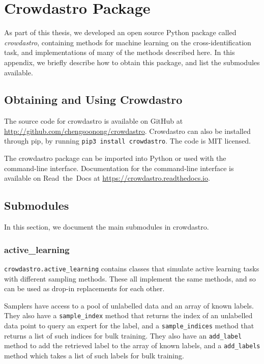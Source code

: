 
\appendix
\chapter{Crowdastro Package}
\label{cha:crowdastro}

As part of this thesis, we developed an open source Python package called
\emph{crowdastro}, containing methods for machine learning on the
cross-identification task, and implementations of many of the methods described
here. In this appendix, we briefly describe how to obtain this package, and list
the submodules available.

\section{Obtaining and Using Crowdastro}

    The source code for crowdastro is available on GitHub at
    \url{http://github.com/chengsoonong/crowdastro}. Crowdastro can also be
    installed through pip, by running \texttt{pip3 install crowdastro}. The code
    is MIT licensed.

    The crowdastro package can be imported into Python or used with the
    command-line interface. Documentation for the command-line interface is
    available on Read~the~Docs at \url{https://crowdastro.readthedocs.io}.

\section{Submodules}
    \label{sec:crowdastro-submodules}

    In this section, we document the main submodules in crowdastro.

    \subsection{active\_learning}
    \label{sec:crowdastro-active-learning}

        \texttt{crowdastro.active\_learning} contains classes that simulate
        active learning tasks with different sampling methods. These all
        implement the same methods, and so can be used as drop-in replacements
        for each other.

        Samplers have access to a pool of unlabelled data and an array of known
        labels. They also have a \texttt{sample\_index} method that returns the
        index of an unlabelled data point to query an expert for the label, and
        a \texttt{sample\_indices} method that returns a list of such indices
        for bulk training. They also have an \texttt{add\_label} method to add
        the retrieved label to the array of known labels, and a
        \texttt{add\_labels} method which takes a list of such labels for bulk
        training.


